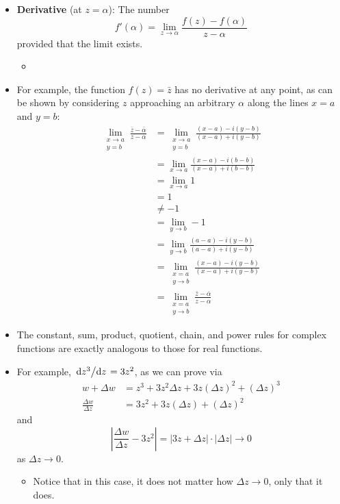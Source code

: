 \documentclass[../main.tex]{subfiles}
\begin{document}
\begin{itemize}
    \item \textbf{Derivative} (at $z=\alpha$): The number
    \begin{equation*}
        f'(\alpha) = \lim_{z\to\alpha}\frac{f(z)-f(\alpha)}{z-\alpha}
    \end{equation*}
    provided that the limit exists.
    \begin{itemize}
        \item {}
    \end{itemize}
    \item For example, the function $f(z)=\bar{z}$ has no derivative at any point, as can be shown by considering $z$ approaching an arbitrary $\alpha$ along the lines $x=a$ and $y=b$:
    \begin{align*}
        \lim_{\substack{x\to a\\y=b}}\frac{\bar{z}-\bar{\alpha}}{z-\alpha} &= \lim_{\substack{x\to a\\y=b}}\frac{(x-a)-i(y-b)}{(x-a)+i(y-b)}\\
        &= \lim_{x\to a}\frac{(x-a)-i(b-b)}{(x-a)+i(b-b)}\\
        &= \lim_{x\to a}1\\
        &= 1\\
        &\neq -1\\
        &= \lim_{y\to b}-1\\
        &= \lim_{y\to b}\frac{(a-a)-i(y-b)}{(a-a)+i(y-b)}\\
        &= \lim_{\substack{x=a\\y\to b}}\frac{(x-a)-i(y-b)}{(x-a)+i(y-b)}\\
        &= \lim_{\substack{x=a\\y\to b}}\frac{\bar{z}-\bar{\alpha}}{z-\alpha}
    \end{align*}
    \item The constant, sum, product, quotient, chain, and power rules for complex functions are exactly analogous to those for real functions.
    \item For example, $\dv*{z^3}{z}=3z^2$, as we can prove via
    \begin{align*}
        w+\Delta w &= z^3+3z^2\Delta z+3z(\Delta z)^2+(\Delta z)^3\\
        \frac{\Delta w}{\Delta z} &= 3z^2+3z(\Delta z)+(\Delta z)^2
    \end{align*}
    and
    \begin{equation*}
        \left| \frac{\Delta w}{\Delta z}-3z^2 \right| = |3z+\Delta z|\cdot|\Delta z| \to 0
    \end{equation*}
    as $\Delta z\to 0$.
    \begin{itemize}
        \item Notice that in this case, it does not matter how $\Delta z\to 0$, only that it does.
    \end{itemize}
\end{itemize}
\end{document}
